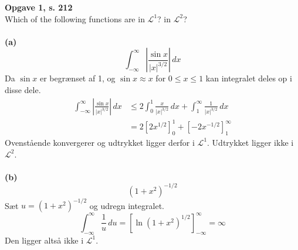 \documentclass[12pt,a4paper,draft]{report}
\author{Frederik Appel Vardinghus-Nielsen}
\begin{document}
\noindent\textbf{Opgave 1, s. 212}\\
Which of the following functions are in $\mathcal{L}^1$? in $\mathcal{L}^2$?\\\\
\textbf{(a)}
\begin{equation}
\int_{-\infty}^{\infty}\!\left|\frac{\sin x}{|x|^{3/2}}\right|\,dx
\end{equation}
Da $\sin x$ er begrænset af 1, og $\sin x\approx x$ for $0\leq x\leq1$ kan integralet deles op i disse dele.
\begin{align}
\int_{-\infty}^{\infty}\!\left|\frac{\sin x}{|x|^{3/2}}\right|\,dx&\leq2\int_0^1\!\frac{x}{|x|^{3/2}}\,dx+\int_1^{\infty}\!\frac{1}{|x|^{3/2}}\,dx\\
&=2\left[2x^{1/2}\right]_0^1+\left[-2x^{-1/2}\right]_1^{\infty}
\end{align}
Ovenstående konvergerer og udtrykket ligger derfor i $\mathcal{L}^1$. Udtrykket ligger ikke i $\mathcal{L}^2$.\\\\
\textbf{(b)}
\begin{equation}
(1+x^2)^{-1/2}
\end{equation}
Sæt $u=(1+x^2)^{-1/2}$ og udregn integralet.
\begin{equation}
\int_{-\infty}^{\infty}\!\frac{1}{u}\,du=\left[\ln(1+x^2)^{1/2}\right]_{-\infty}^{\infty}=\infty
\end{equation}
Den ligger altså ikke i $\mathcal{L}^1$.
\end{document}
